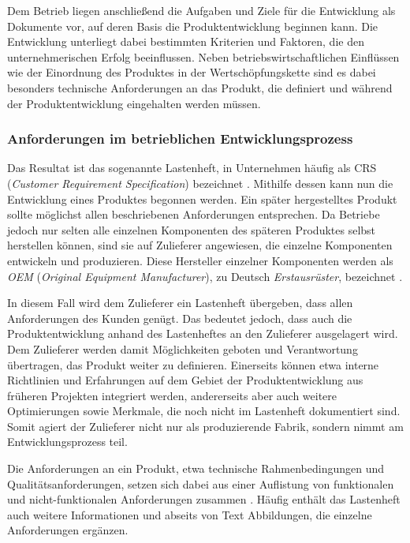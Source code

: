 \documentclass[12pt]{report}
\begin{document}
Dem Betrieb liegen anschließend die Aufgaben und Ziele für die Entwicklung als Dokumente vor, auf deren Basis die Produktentwicklung beginnen kann. Die Entwicklung unterliegt dabei bestimmten Kriterien und Faktoren, die den unternehmerischen Erfolg beeinflussen. Neben betriebswirtschaftlichen Einflüssen wie der Einordnung des Produktes in der Wertschöpfungskette sind es dabei besonders technische Anforderungen an das Produkt, die definiert und während der Produktentwicklung eingehalten werden müssen.

\subsubsection{Anforderungen im betrieblichen Entwicklungsprozess}
Das Resultat ist das sogenannte Lastenheft, in Unternehmen häufig als CRS (\textit{Customer Requirement Specification}) bezeichnet \cite{dge19}. Mithilfe dessen kann nun die Entwicklung eines Produktes begonnen werden. Ein später hergestelltes Produkt sollte möglichst allen beschriebenen Anforderungen entsprechen. Da Betriebe jedoch nur selten alle einzelnen Komponenten des späteren Produktes selbst herstellen können, sind sie auf Zulieferer angewiesen, die einzelne Komponenten entwickeln und produzieren. Diese Hersteller einzelner Komponenten werden als \textit{OEM} (\textit{Original Equipment Manufacturer}), zu Deutsch \textit{Erstausrüster}, bezeichnet \cite{ir09}.  

In diesem Fall wird dem Zulieferer ein Lastenheft übergeben, dass allen Anforderungen des Kunden genügt. Das bedeutet jedoch, dass auch die Produktentwicklung anhand des Lastenheftes an den Zulieferer ausgelagert wird. Dem Zulieferer werden damit Möglichkeiten geboten und Verantwortung übertragen, das Produkt weiter zu definieren. Einerseits können etwa interne Richtlinien und Erfahrungen auf dem Gebiet der Produktentwicklung aus früheren Projekten integriert werden, andererseits aber auch weitere Optimierungen sowie Merkmale, die noch nicht im Lastenheft dokumentiert sind. Somit agiert der Zulieferer nicht nur als produzierende Fabrik, sondern nimmt am Entwicklungsprozess teil.

Die Anforderungen an ein Produkt, etwa technische Rahmenbedingungen und Qualitätsanforderungen, setzen sich dabei aus einer Auflistung von funktionalen und nicht-funktionalen Anforderungen zusammen \cite{bal10}. Häufig enthält das Lastenheft auch weitere Informationen und abseits von Text Abbildungen, die einzelne Anforderungen ergänzen. 
\end{document}

